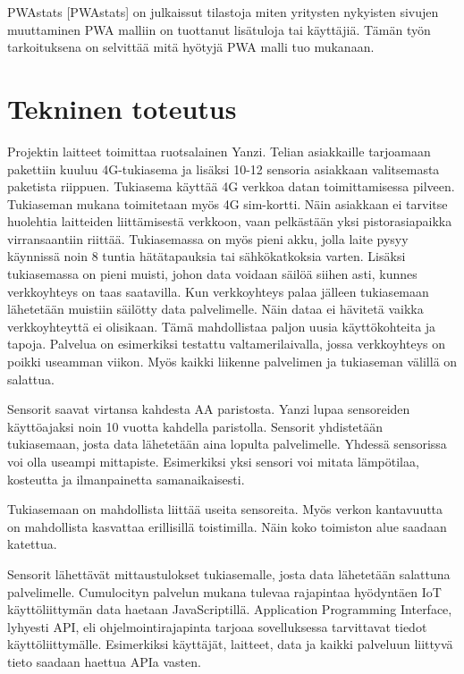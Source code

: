 \documentclass{tktltiki}
\begin{document}
PWAstats [PWAstats] on julkaissut tilastoja miten yritysten nykyisten sivujen muuttaminen PWA malliin on tuottanut lisätuloja tai käyttäjiä. Tämän työn tarkoituksena on selvittää mitä hyötyjä PWA malli tuo mukanaan.

\newpage
\section{Tekninen toteutus}

Projektin laitteet toimittaa ruotsalainen Yanzi. Telian asiakkaille tarjoamaan pakettiin kuuluu 4G-tukiasema ja lisäksi 10-12 sensoria asiakkaan valitsemasta paketista riippuen. Tukiasema käyttää 4G verkkoa datan toimittamisessa pilveen. Tukiaseman mukana toimitetaan myös 4G sim-kortti. Näin asiakkaan ei tarvitse huolehtia laitteiden liittämisestä verkkoon, vaan pelkästään yksi pistorasiapaikka virransaantiin riittää. Tukiasemassa on myös pieni akku, jolla laite pysyy käynnissä noin 8 tuntia hätätapauksia tai sähkökatkoksia varten. Lisäksi tukiasemassa on pieni muisti, johon data voidaan säilöä siihen asti, kunnes verkkoyhteys on taas saatavilla. Kun verkkoyhteys palaa jälleen tukiasemaan lähetetään muistiin säilötty data palvelimelle. Näin dataa ei hävitetä vaikka verkkoyhteyttä ei olisikaan. Tämä mahdollistaa paljon uusia käyttökohteita ja tapoja. Palvelua on esimerkiksi testattu valtamerilaivalla, jossa verkkoyhteys on poikki useamman viikon. Myös kaikki liikenne palvelimen ja tukiaseman välillä on salattua.

Sensorit saavat virtansa kahdesta AA paristosta. Yanzi lupaa sensoreiden käyttöajaksi noin 10 vuotta kahdella paristolla. Sensorit yhdistetään tukiasemaan, josta data lähetetään aina lopulta palvelimelle. Yhdessä sensorissa voi olla useampi mittapiste. Esimerkiksi yksi sensori voi mitata lämpötilaa, kosteutta ja ilmanpainetta samanaikaisesti. 

Tukiasemaan on mahdollista liittää useita sensoreita. Myös verkon kantavuutta on mahdollista kasvattaa erillisillä toistimilla. Näin koko toimiston alue saadaan katettua. 

Sensorit lähettävät mittaustulokset tukiasemalle, josta data lähetetään salattuna palvelimelle. Cumulocityn palvelun mukana tulevaa rajapintaa hyödyntäen IoT käyttöliittymän data haetaan JavaScriptillä. Application Programming Interface, lyhyesti API, eli ohjelmointirajapinta tarjoaa sovelluksessa tarvittavat tiedot käyttöliittymälle. Esimerkiksi käyttäjät, laitteet, data ja kaikki palveluun liittyvä tieto saadaan haettua APIa vasten. 
\end{document}
